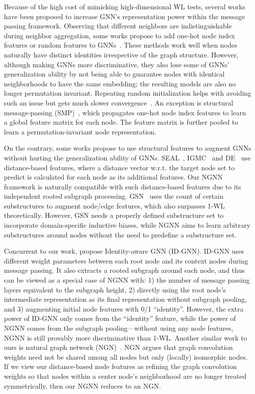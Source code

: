 \documentclass{article}
\begin{document}
Because of the high cost of mimicking high-dimensional WL tests, several works have been proposed to increase GNN's representation power within the message passing framework. Observing that different neighbors are indistinguishable during neighbor aggregation, some works propose to add one-hot node index features or random features to GNNs~\citep{loukas2019graph,sato2020random}. These methods work well when nodes naturally have distinct identities irrespective of the graph structure. However, although making GNNs more discriminative, they also lose some of GNNs' generalization ability by not being able to guarantee nodes with identical neighborhoods to have the same embedding; the resulting models are also no longer permutation invariant. Repeating random initialization helps with avoiding such an issue but gets much slower convergence~\cite{abboud2020surprising}. An exception is structural message-passing (SMP)~\citep{vignac2020building}, which propagates one-hot node index features to learn a global  feature matrix for each node. The feature matrix is further pooled to learn a permutation-invariant node representation. 


On the contrary, some works propose to use structural features to augment GNNs without hurting the generalization ability of GNNs. SEAL~\citep{zhang2018link,zhang2020revisiting}, IGMC~\citep{Zhang2020Inductive} and DE~\citep{li2020distance} use distance-based features, where a distance vector w.r.t. the target node set to predict is calculated for each node as its additional features. Our NGNN framework is naturally compatible with such distance-based features due to its independent rooted subgraph processing. GSN~\citep{bouritsas2020improving} uses the count of certain substructures to augment node/edge features, which also surpasses 1-WL theoretically. However, GSN needs a properly defined substructure set to incorporate domain-specific inductive biases, while NGNN aims to learn arbitrary substructures around nodes without the need to predefine a substructure set.


Concurrent to our work, \citet{you2021identity} propose Identity-aware GNN (ID-GNN). ID-GNN uses different weight parameters between each root node and its context nodes during message passing. It also extracts a rooted subgraph around each node, and thus can be viewed as a special case of NGNN with: 1) the number of message passing layers equivalent to the subgraph height, 2) directly using the root node's intermediate representation as its final representation without subgraph pooling, and 3) augmenting initial node features with 0/1 ``identity''. However, the extra power of ID-GNN only comes from the ``identity'' feature, while the power of NGNN comes from the subgraph pooling---without using any node features, NGNN is still provably more discriminative than 1-WL. Another similar work to ours is natural graph network (NGN)~\citep{de2020natural}. NGN argues that graph convolution weights need not be shared among all nodes but only (locally) isomorphic nodes. If we view our distance-based node features as refining the graph convolution weights so that nodes within a center node's neighborhood are no longer treated symmetrically, then our NGNN reduces to an NGN.
\end{document}
